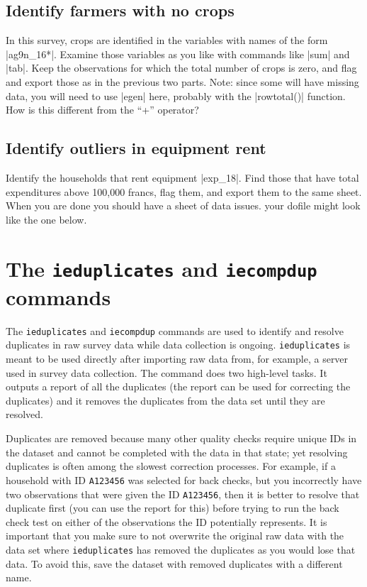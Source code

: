 \documentclass{tufte-handout}
\begin{document}
\subsection{Identify farmers with no crops}
In this survey, crops are identified in the variables with names
of the form |ag9n_16*|. Examine those variables as you like
with commands like |sum| and |tab|.
Keep the observations for which the total number of crops is zero,
and flag and export those as in the previous two parts.
Note: since some will have missing data, you will need to use |egen| here,
probably with the |rowtotal()| function.
How is this different from the “+” operator?

\subsection{Identify outliers in equipment rent}
Identify the households that rent equipment |exp_18|.
Find those that have total expenditures above 100,000 francs, flag them,
and export them to the same sheet.
When you are done you should have a sheet of data issues.
your dofile might look like the one below.

\section{The \texttt{ieduplicates} and \texttt{iecompdup} commands}

The \texttt{ieduplicates} and \texttt{iecompdup} commands
are used to identify and resolve duplicates in raw survey data while data collection is ongoing.
\texttt{ieduplicates} is meant to be used directly after importing raw data from,
for example, a server used in survey data collection. The command does two high-level tasks.
It outputs a report of all the duplicates (the report can be used for correcting the duplicates)
and it removes the duplicates from the data set until they are resolved.

Duplicates are removed because many other quality checks require unique IDs
in the dataset and cannot be completed with the data in that state;
yet resolving duplicates is often among the slowest correction processes.
For example, if a household with ID \texttt{A123456} was selected for back checks,
but you incorrectly have two observations that were given the ID \texttt{A123456},
then it is better to resolve that duplicate first (you can use the report for this)
before trying to run the back check test on either of the observations the ID potentially represents.
It is important that you make sure to not overwrite the original raw data
with the data set where \texttt{ieduplicates} has removed the duplicates
as you would lose that data. To avoid this,
save the dataset with removed duplicates with a different name.
\end{document}
